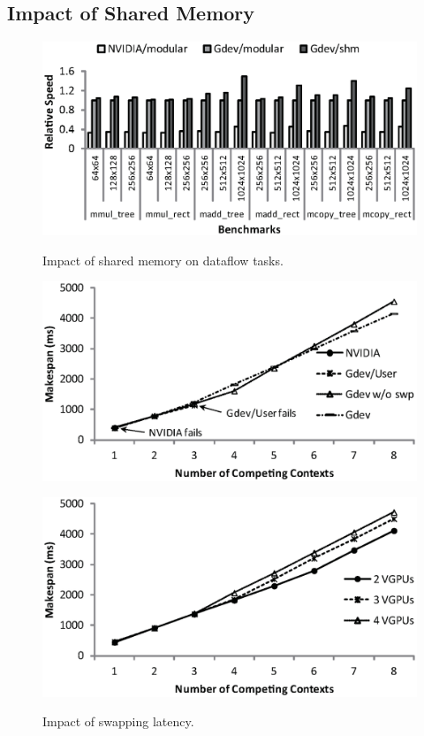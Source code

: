 \vspace{-0.25em}
\subsection{Impact of Shared Memory}
\vspace{-0.25em}

\begin{figure}[t]
 \begin{center}
  \includegraphics[width=\hsize]{eps/dataflow.eps}\\
  \vspace{-1.5em}
  \caption{Impact of shared memory on dataflow tasks.}
  \label{fig:dataflow}
 \end{center}
 \vspace{-1.5em}
 \begin{center}
  \includegraphics[width=0.75\hsize]{eps/swapping.eps}\\
  \vspace{-1.5em}
  \caption{Impact of swapping latency.}
  \label{fig:swapping}
 \end{center}
 \vspace{-1.5em}
 \begin{center}
  \includegraphics[width=0.75\hsize]{eps/swapping_vgpu.eps}\\

\end{center}
\end{figure}
